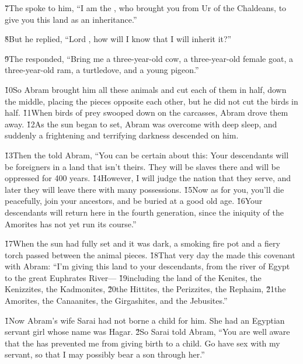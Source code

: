 \v{7}The  spoke to him, ``I am the , who brought you from Ur of the Chaldeans, to give you this land as an inheritance.''

\v{8}But he replied, ``Lord , how will I know that I will inherit it?''

\v{9}The  responded, ``Bring me a three-year-old cow, a three-year-old female goat, a three-year-old ram, a turtledove, and a young pigeon.''

\v{10}So Abram brought him all these animals and cut each of them in half, down the middle, placing the pieces opposite each other, but he did not cut the birds in half. \v{11}When birds of prey swooped down on the carcasses, Abram drove them away. \v{12}As the sun began to set, Abram was overcome with deep sleep, and suddenly a frightening and terrifying darkness descended on him.

\v{13}Then the  told Abram, ``You can be certain about this: Your descendants will be foreigners in a land that isn't theirs. They will be slaves there and will be oppressed for 400 years. \v{14}However, I will judge the nation that they serve, and later they will leave there with many possessions. \v{15}Now as for you, you'll die peacefully, join your ancestors, and be buried at a good old age. \v{16}Your descendants will return here in the fourth generation, since the iniquity of the Amorites has not yet run its course.''

\v{17}When the sun had fully set and it was dark, a smoking fire pot and a fiery torch passed between the animal pieces. \v{18}That very day the  made this covenant with Abram: ``I'm giving this land to your descendants, from the river of Egypt to the great Euphrates River--- \v{19}including the land of the Kenites, the Kenizzites, the Kadmonites, \v{20}the Hittites, the Perizzites, the Rephaim, \v{21}the Amorites, the Canaanites, the Girgashites, and the Jebusites.''

\v{1}Now Abram's wife Sarai had not borne a child for him. She had an Egyptian servant girl whose name was Hagar. \v{2}So Sarai told Abram, ``You are well aware that the  has prevented me from giving birth to a child. Go have sex with my servant, so that I may possibly bear a son through her.''

